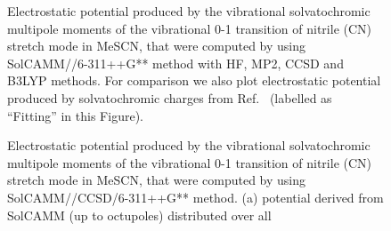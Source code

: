 \documentclass[a4paper,titlepage,twoside,fleqn,12pt]{book}
\begin{document}
\begin{refsection}
%
\begin{figure}[t!]
\centering
\setlength\fboxsep{0.4pt}
\setlength\fboxrule{0.5pt}
\caption{
Electrostatic potential produced by the vibrational solvatochromic multipole moments of the vibrational 0-1
transition of nitrile (CN) stretch mode in MeSCN, that were computed by using 
SolCAMM//6-311++G** method with HF, MP2, CCSD and B3LYP methods. For comparison
we also plot electrostatic potential produced by solvatochromic charges 
from Ref.~\citep{Lee.Choi.Cho.JCP.2012} (labelled as ``Fitting'' in this Figure).
\label{f:mescn-maps-all}}
\end{figure}
%
%
\begin{figure}[t!]
\centering
\setlength\fboxsep{0.4pt}
\setlength\fboxrule{0.5pt}
\caption{
Electrostatic potential produced by the vibrational solvatochromic multipole moments of the vibrational 0-1
transition of nitrile (CN) stretch mode in MeSCN, that were computed by using 
SolCAMM//CCSD/6-311++G** method. (a) potential derived from SolCAMM (up to octupoles) distributed over all 
}
\end{figure}
\end{refsection}
\end{document}
